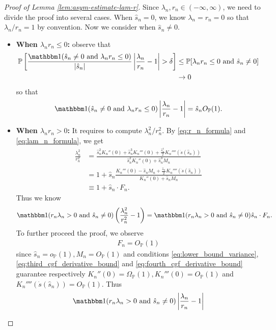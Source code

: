\documentclass[12pt]{article}
\theoremstyle{definition}
\def\P{\mathbb{P}}
\def\P{\mathbb{P}}
\renewcommand{\P}{\mathbb{P}}							%
\newcommand{\indicator}{\mathbbm 1}						%
\begin{document}
\begin{proof}[Proof of Lemma \ref{lem:asym-estimate-lam-r}]
	Since $\lambda_n,r_n\in (-\infty,\infty)$, we need to divide the proof into several cases. When $\hat s_n=0$, we know $\lambda_n=r_n=0$ so that $\lambda_n/r_n=1$ by convention. Now we consider when $\hat s_n\neq 0$.
	\begin{itemize}
		\item \textbf{When $\lambda_n r_n \leq 0$:} observe that
		\begin{align*}
			\P\left[\frac{\indicator(\hat s_n\neq 0 \text{ and }\lambda_nr_n\leq 0)}{|\hat s_n|}\left|\frac{\lambda_n}{r_n}-1\right|>\delta\right]
			&
			\leq \P[\lambda_nr_n\leq 0\text{ and }\hat s_n\neq 0]\\
			&
			\rightarrow0
		\end{align*}
		so that
		\begin{align*}
			\indicator(\hat s_n\neq 0 \text{ and }\lambda_nr_n\leq 0)\left|\frac{\lambda_n}{r_n}-1\right|=\hat s_n O_{\P}(1).
		\end{align*}
		\item \textbf{When $\lambda_n r_n > 0$:}
		It requires to compute $\lambda_n^2/r_n^2$. By \eqref{eq:r_n_formula} and \eqref{eq:lam_n_formula}, we get
		\begin{align*}
			\frac{\lambda_n^2}{r_n^2}
			&
			=\frac{\hat s_n^2 K_n''(0)+\hat s_n^3 K_n'''(0)+\frac{\hat s_n^4}{2}K_n''''(\dot s(\hat s_n))}{\hat s_n^2K_n''(0)+\hat s_n^3M_n}\\
			&
			=1+\hat s_n\frac{K_n'''(0)-\hat s_nM_n+\frac{\hat s_n}{2}K_n''''(\dot s(\hat s_n))}{K_n''(0)+\hat s_nM_n}\\
			&
			\equiv 1+\hat s_n \cdot F_n.
		\end{align*}
		Thus we know 
		\begin{align*}
			\indicator(r_n\lambda_n>0 \text{ and }\hat s_n\neq 0)\left(\frac{\lambda_n^2}{r_n^2}-1\right)= \indicator(r_n\lambda_n>0\text{ and }\hat s_n\neq 0)\hat s_n \cdot F_n.
		\end{align*}
		To further proceed the proof, we observe
		\begin{align*}
			F_n=O_{\P}(1)
		\end{align*}
		since $\hat s_n=o_{\P}(1),M_n=O_{\P}(1)$ and conditions \eqref{eq:lower_bound_variance}, \eqref{eq:third_cgf_derivative_bound} and \eqref{eq:fourth_cgf_derivative_bound} guarantee respectively $K_n''(0)=\Omega_\P(1),K_n'''(0)=O_{\P}(1)$ and $K_n''''(\dot s(\hat s_n))=O_{\P}(1)$. Thus 
		\begin{align*}
			\indicator(r_n\lambda_n>0 \text{ and }\hat s_n\neq 0)\left|\frac{\lambda_n}{r_n}-1\right|

\end{align*}
\end{itemize}
\end{proof}
\end{document}
